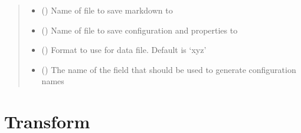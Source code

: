 \documentclass[letterpaper,10pt,english]{sphinxmanual}
\begin{document}
\begin{fulllineitems}
\begin{fulllineitems}
\begin{quote}
\begin{description}
\begin{itemize}
\item {} 
\sphinxAtStartPar
{} () \textendash{} Name of file to save markdown to

\item {} 
\sphinxAtStartPar
{} () \textendash{} Name of file to save configuration and properties to

\item {} 
\sphinxAtStartPar
{} () \textendash{} Format to use for data file. Default is ‘xyz’

\item {} 
\sphinxAtStartPar
{} () \textendash{} The name of the field that should be used to generate
configuration names

\end{itemize}

\end{description}\end{quote}

\end{fulllineitems}


\end{fulllineitems}

\label{\detokenize{transformations:module-colabfit.tools.transformations}}

\section{Transform}
\label{\detokenize{transformations:transform}}\label{\detokenize{transformations::doc}}
\end{document}

